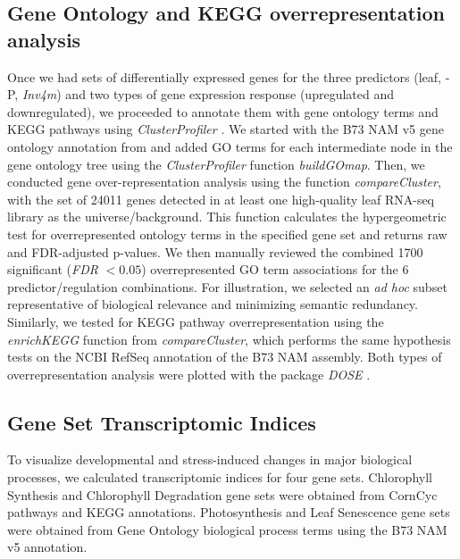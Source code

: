 \documentclass[9pt,twocolumn,twoside]{rilabRxiv}
\newcommand{\invfour}{\textit{Inv4m}\xspace}
\begin{document}
\subsection*{Gene Ontology and KEGG overrepresentation analysis}

Once we had sets of differentially expressed genes for the three predictors (leaf, -P, \invfour) and two types of gene expression response (upregulated and downregulated), we proceeded to annotate them with gene ontology terms and KEGG pathways using \textit{ClusterProfiler} \cite{yu2012,zicola2024}.  
We started with the B73 NAM v5 gene ontology annotation from \cite{fattel2024} and added GO terms for each intermediate node in the gene ontology tree using the \textit{ClusterProfiler} function \textit{buildGOmap}. 
Then, we conducted gene over-representation analysis using the function \textit{compareCluster}, with the set of 24011 genes detected in at least one high-quality leaf RNA-seq library as the universe/background. 
This function calculates the hypergeometric test for overrepresented ontology terms in the specified gene set and returns raw and FDR-adjusted p-values.
We then manually reviewed the combined 1700 significant (\textit{FDR} $<0.05$) overrepresented GO term associations for the 6 predictor/regulation combinations. For illustration, we selected an \textit{ad hoc} subset representative of biological relevance and minimizing semantic redundancy.
Similarly, we tested for KEGG pathway overrepresentation using the \textit{enrichKEGG} function from \textit{compareCluster}, which performs the same hypothesis tests on the NCBI RefSeq annotation of the B73 NAM assembly. 
Both types of overrepresentation analysis were plotted with the package \textit{DOSE} \cite{yu2015}.

\subsection*{Gene Set Transcriptomic Indices}
To visualize developmental and stress-induced changes in major biological processes, we calculated transcriptomic indices for four gene sets. Chlorophyll Synthesis and Chlorophyll Degradation gene sets were obtained from CornCyc pathways and KEGG annotations. Photosynthesis and Leaf Senescence gene sets were obtained from Gene Ontology biological process terms using the B73 NAM v5 annotation. 
\end{document}
